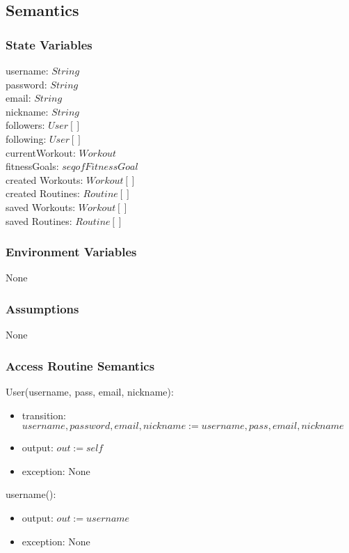 \documentclass[12pt, titlepage]{article}
\begin{document}
\subsection{Semantics}

\subsubsection{State Variables}
username: $String$ \\
password: $String$ \\
email: $String$ \\
nickname: $String$ \\
followers: $User[]$ \\
following: $User[]$ \\
currentWorkout: $Workout$\\
fitnessGoals: $seq of FitnessGoal$ \\
created Workouts: $Workout[]$ \\
created Routines: $Routine[]$ \\
saved Workouts: $Workout[]$ \\
saved Routines: $Routine[]$ \\

\subsubsection{Environment Variables}
None
\subsubsection{Assumptions}
None
\subsubsection{Access Routine Semantics}

User(username, pass, email, nickname):
\begin{itemize}
	\item transition: $username, password, email, nickname := username, pass, email, nickname$
	\item output: $out := self$
	\item exception: None
\end{itemize}


\noindent username():
\begin{itemize}
	\item output: $out := username$
	\item exception: None
\end{itemize}
\end{document}
